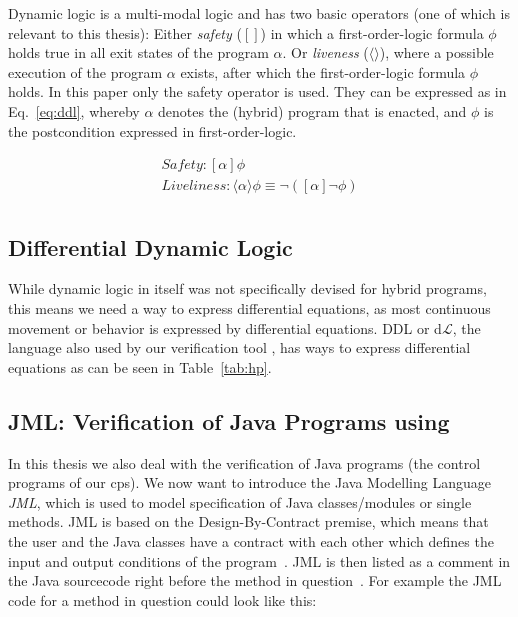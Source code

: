 Dynamic logic is a multi-modal logic and has two basic operators (one of which is relevant to this thesis): Either \textit{safety} (\([]\)) in which a first-order-logic formula \(\phi\) holds true in all exit states of the program \(\alpha\). Or \textit{liveness} (\(\langle\rangle\)), where a possible execution of the program \(\alpha\) exists, after which the first-order-logic formula \(\phi\) holds. In this paper only the safety operator is used. They can be expressed as in Eq.~\ref{eq:ddl}, whereby \(\alpha\) denotes the (hybrid) program that is enacted, and \(\phi\) is the postcondition expressed in first-order-logic.

\begin{equation}
	\begin{split}
		Safety: [\alpha]\phi \\
		Liveliness: \langle\alpha\rangle\phi \equiv \neg ([\alpha] \neg \phi) \\
	\end{split}
	\label{eq:ddl}
\end{equation}

\subsection{Differential Dynamic Logic}
\label{subsec:DDL}

While dynamic logic in itself was not specifically devised for hybrid programs, this means we need a way to express differential equations, as most continuous movement or behavior is expressed by differential equations. DDL or d\(\mathcal{L}\), the language also used by our verification tool \keym, has ways to express differential equations as can be seen in Table~\ref{tab:hp}.

\subsection{JML: Verification of Java Programs using \key}
\label{subsec:jml}

In this thesis we also deal with the verification of Java programs (the control programs of our cps). We now want to introduce the Java Modelling Language \textit{JML}, which is used to model specification of Java classes/modules or single methods. JML is based on the Design-By-Contract premise, which means that the user and the Java classes have a contract with each other which defines the input and output conditions of the program~\cite{keybook2007}. JML is then listed as a comment in the Java sourcecode right before the method in question~\cite{fmcoKeYTutorial06}. For example the JML code for a method in question could look like this:


